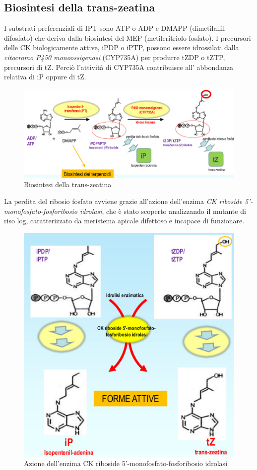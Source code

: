 \documentclass[a4paper,12pt]{book}
\begin{document}
\subsection{Biosintesi della trans-zeatina}

I substrati preferenziali di IPT sono ATP o ADP e DMAPP (dimetilallil difosfato) che deriva dalla biosintesi del MEP (metileritriolo fosfato).
I precursori delle CK biologicamente attive, iPDP o iPTP, possono essere idrossilati dalla \emph{citocromo P450
monoossigenasi} (CYP735A) per produrre tZDP o tZTP, precursori di tZ. Perciò l’attività di CYP735A contribuisce all’
abbondanza relativa di iP oppure di tZ.

\begin{figure}[H]
\centering
\includegraphics[scale=0.4]{immagini/biosintesi2.jpg}
\caption{Biosintesi della trans-zeatina}
\end{figure}

La perdita del ribosio fosfato avviene grazie all'azione dell'enzima \emph{CK riboside 5'-monofosfato-fosforibosio idrolasi}, che è stato scoperto analizzando il mutante di riso log, caratterizzato da meristema apicale difettoso e incapace di funzionare.
\begin{figure}[H]
\centering
\includegraphics[scale=0.4]{immagini/bio3.jpg}
\caption{Azione dell'enzima CK riboside 5'-monofosfato-fosforibosio idrolasi}
\end{figure}
\end{document}
